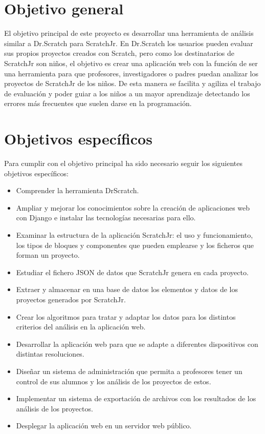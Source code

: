 \documentclass[a4paper, 12pt]{book}
\begin{document}
\section{Objetivo general} %
\label{sec:objetivo-general} %

El objetivo principal de este proyecto es desarrollar una herramienta de análisis similar a Dr.Scratch para ScratchJr.
En Dr.Scratch los usuarios pueden evaluar sus propios proyectos creados con Scratch, pero como los destinatarios de ScratchJr son niños, el objetivo es crear una aplicación web con la función de ser una herramienta para que profesores, investigadores o padres puedan analizar los proyectos de ScratchJr de los niños.
De esta manera se facilita y agiliza el trabajo de evaluación y poder guiar a los niños a un mayor aprendizaje detectando los errores más frecuentes que suelen darse en la programación.


\section{Objetivos específicos}
\label{sec:objetivos-especificos}

Para cumplir con el objetivo principal ha sido necesario seguir los siguientes objetivos específicos:

\begin{itemize}
    \item Comprender la herramienta DrScratch.
    \item Ampliar y mejorar los conocimientos sobre la creación de aplicaciones web con Django e instalar las tecnologías necesarias para ello.
    \item Examinar la estructura de la aplicación ScratchJr: el uso y funcionamiento, los tipos de bloques y componentes que pueden emplearse y los ficheros que forman un proyecto.
    \item Estudiar el fichero JSON de datos que ScratchJr genera en cada proyecto.
    \item Extraer y almacenar en una base de datos los elementos y datos de los proyectos generados por ScratchJr.
    \item Crear los algoritmos para tratar y adaptar los datos para los distintos criterios del análisis en la aplicación web.
    \item Desarrollar la aplicación web para que se adapte a diferentes dispositivos con distintas resoluciones.
    \item Diseñar un sistema de administración que permita a profesores tener un control de sus alumnos y los análisis de los proyectos de estos.
    \item Implementar un sistema de exportación de archivos con los resultados de los análisis de los proyectos.
    \item Desplegar la aplicación web en un servidor web público.
    
\end{itemize}
\end{document}
